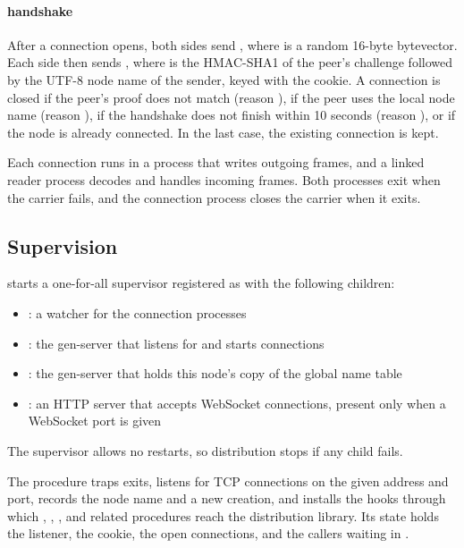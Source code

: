\paragraph* {handshake} After a
connection opens, both sides send , where  is a
random 16-byte bytevector. Each side then sends , where  is the HMAC-SHA1 of the peer's
challenge followed by the UTF-8 node name of the sender, keyed with the
cookie. A connection is closed if the peer's proof does not match
(reason ), if the peer uses the local node name
(reason ), if the handshake does not finish within 10
seconds (reason ), or if the node is already
connected. In the last case, the existing connection is kept.

Each connection runs in a process that writes outgoing frames, and a
linked reader process decodes and handles incoming frames. Both
processes exit when the carrier fails, and the connection process
closes the carrier when it exits.

\subsection {Supervision}

 starts a one-for-all supervisor registered as
 with the following children:\antipar

\begin{itemize}
\item {}: a watcher for the connection processes
\item {}: the gen-server that listens for and starts
  connections
\item {}: the gen-server that holds this node's
  copy of the global name table
\item {}: an HTTP server that accepts WebSocket
  connections, present only when a WebSocket port is given
\end{itemize}

The supervisor allows no restarts, so distribution stops if any child
fails.

 The  procedure traps exits,
listens for TCP connections on the given address and port, records the
node name and a new creation, and installs the hooks through which
, , , and related procedures reach
the distribution library. Its state holds the listener, the cookie,
the open connections, and the callers waiting in
.

